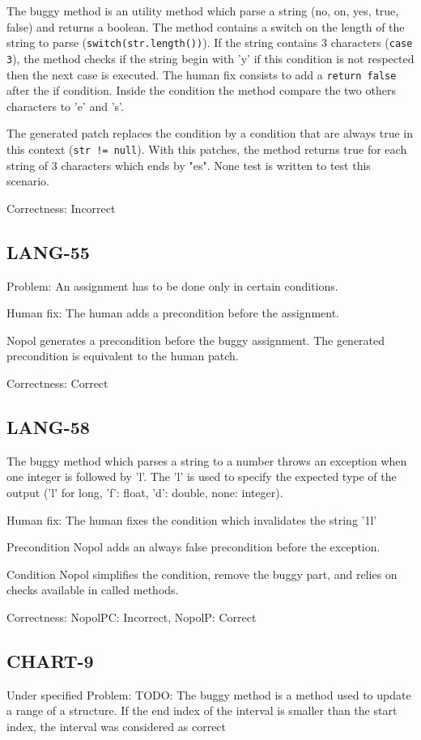 \documentclass{article}
\newcommand{\mycode}[1]{{\small \texttt{#1}}\xspace}
\newcommand{\todo}[1]{{\color{red}TODO: #1}}
\begin{document}
The buggy method is an utility method which parse a string (no, on, yes, true, false) and returns a boolean. The method contains a switch on the length of the string to parse (\mycode{switch(str.length())}). If the string contains 3 characters (\mycode{case 3}), the method checks if the string begin with 'y' if this condition is not respected then the next case is executed. The human fix consists to add a \mycode{return false} after the if condition. Inside the condition the method compare the two others characters to 'e' and 's'.  

The generated patch replaces the condition by a condition that are always true in this context (\mycode{str != null}). With this patches, the method returns true for each string of 3 characters which ends by "es". None test is written to test this scenario.

Correctness: Incorrect

\subsection{LANG-55}

Problem:
An assignment has to be done only in certain conditions.

Human fix:
The human adds a precondition before the assignment.

Nopol generates a precondition before the buggy assignment. The generated precondition is equivalent to the human patch.

Correctness: Correct


\subsection{LANG-58}
The buggy method which parses a string to a number throws an exception when one integer is followed by 'l'. The 'l' is used to specify the expected type of the output ('l' for long, 'f': float, 'd': double, none: integer).

Human fix:
The human fixes the condition which invalidates the string '1l'

Precondition Nopol  adds an always false precondition before the exception.

Condition Nopol simplifies the condition, remove the buggy part, and relies on checks available in called methods.

Correctness: NopolPC: Incorrect, NopolP: Correct


\subsection{CHART-9} Under specified
Problem: \todo{The buggy method is a method used to update a range of a structure. If the end index of the interval is smaller than the start index, the interval was considered as correct}
\end{document}
